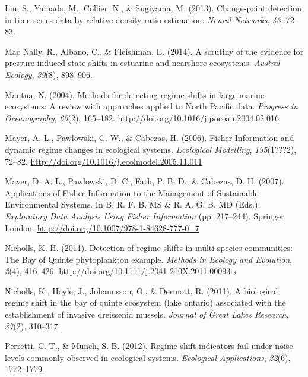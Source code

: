 \documentclass[12pt,twoside,openany]{reedthesis}
\begin{document}
\leavevmode\hypertarget{ref-liu2013change}{}%
Liu, S., Yamada, M., Collier, N., \& Sugiyama, M. (2013). Change-point detection in time-series data by relative density-ratio estimation. \emph{Neural Networks}, \emph{43}, 72--83.

\leavevmode\hypertarget{ref-mac2014scrutiny}{}%
Mac Nally, R., Albano, C., \& Fleishman, E. (2014). A scrutiny of the evidence for pressure-induced state shifts in estuarine and nearshore ecosystems. \emph{Austral Ecology}, \emph{39}(8), 898--906.

\leavevmode\hypertarget{ref-mantua_methods_2004}{}%
Mantua, N. (2004). Methods for detecting regime shifts in large marine ecosystems: A review with approaches applied to North Pacific data. \emph{Progress in Oceanography}, \emph{60}(2), 165--182. \url{http://doi.org/10.1016/j.pocean.2004.02.016}

\leavevmode\hypertarget{ref-mayer_fisher_2006}{}%
Mayer, A. L., Pawlowski, C. W., \& Cabezas, H. (2006). Fisher Information and dynamic regime changes in ecological systems. \emph{Ecological Modelling}, \emph{195}(1???2), 72--82. \url{http://doi.org/10.1016/j.ecolmodel.2005.11.011}

\leavevmode\hypertarget{ref-mayer_applications_2007}{}%
Mayer, D. A. L., Pawlowski, D. C., Fath, P. B. D., \& Cabezas, D. H. (2007). Applications of Fisher Information to the Management of Sustainable Environmental Systems. In B. R. F. B. MS \& R. A. G. B. MD (Eds.), \emph{Exploratory Data Analysis Using Fisher Information} (pp. 217--244). Springer London. \url{http://doi.org/10.1007/978-1-84628-777-0_7}

\leavevmode\hypertarget{ref-nicholls_detection_2011}{}%
Nicholls, K. H. (2011). Detection of regime shifts in multi-species communities: The Bay of Quinte phytoplankton example. \emph{Methods in Ecology and Evolution}, \emph{2}(4), 416--426. \url{http://doi.org/10.1111/j.2041-210X.2011.00093.x}

\leavevmode\hypertarget{ref-nicholls2011biological}{}%
Nicholls, K., Hoyle, J., Johannsson, O., \& Dermott, R. (2011). A biological regime shift in the bay of quinte ecosystem (lake ontario) associated with the establishment of invasive dreissenid mussels. \emph{Journal of Great Lakes Research}, \emph{37}(2), 310--317.

\leavevmode\hypertarget{ref-perretti2012regime}{}%
Perretti, C. T., \& Munch, S. B. (2012). Regime shift indicators fail under noise levels commonly observed in ecological systems. \emph{Ecological Applications}, \emph{22}(6), 1772--1779.
\end{document}
